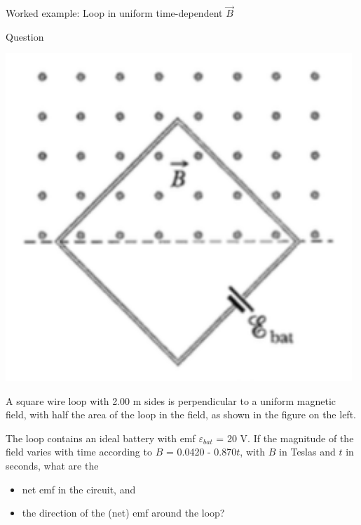 {
\problemslide

%
%
%

\begin{frame}{Worked example: Loop in uniform time-dependent $\vec{B}$}

  \begin{blockexmplque}{Question}

    \begin{minipage}[l]{0.30\textwidth}
     \begin{center}
    	 \includegraphics[width=0.98\textwidth]{./images/problems/lect08_square_loop_with_emf_partially_within_bfield}\\
     \end{center}
    \end{minipage}
    \begin{minipage}[r]{0.69\textwidth}
      A square wire loop with 2.00 m sides is perpendicular to a uniform
      magnetic field, with half the area of the loop in the field,
       as shown in the figure on the left.

      The loop contains an ideal battery with emf $\varepsilon_{bat}$ = 20 V.
      If the magnitude of the field varies with time according
      to $B$ = 0.0420 - 0.870$t$,
      with $B$ in Teslas and $t$ in seconds, what are the
      \begin{itemize}
        \item net emf in the circuit, and
        \item the direction of the (net) emf around the loop?
      \end{itemize}
    \end{minipage}


\end{blockexmplque}
\end{frame}}
